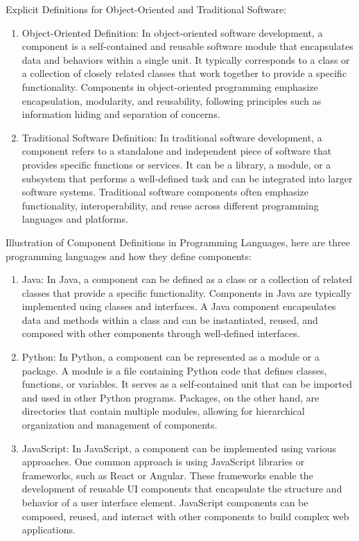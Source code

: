 \documentclass{article}
\begin{document}
Explicit Definitions for Object-Oriented and Traditional Software:
\begin{enumerate}
    \item Object-Oriented Definition: In object-oriented software development, a component is a self-contained and reusable software module that encapsulates data and behaviors within a single unit. It typically corresponds to a class or a collection of closely related classes that work together to provide a specific functionality. Components in object-oriented programming emphasize encapsulation, modularity, and reusability, following principles such as information hiding and separation of concerns.
    \item Traditional Software Definition: In traditional software development, a component refers to a standalone and independent piece of software that provides specific functions or services. It can be a library, a module, or a subsystem that performs a well-defined task and can be integrated into larger software systems. Traditional software components often emphasize functionality, interoperability, and reuse across different programming languages and platforms.
\end{enumerate}
Illustration of Component Definitions in Programming Languages, here are three programming languages and how they define components:
\begin{enumerate}
    \item Java: In Java, a component can be defined as a class or a collection of related classes that provide a specific functionality. Components in Java are typically implemented using classes and interfaces. A Java component encapsulates data and methods within a class and can be instantiated, reused, and composed with other components through well-defined interfaces.
    \item Python: In Python, a component can be represented as a module or a package. A module is a file containing Python code that defines classes, functions, or variables. It serves as a self-contained unit that can be imported and used in other Python programs. Packages, on the other hand, are directories that contain multiple modules, allowing for hierarchical organization and management of components.
    \item JavaScript: In JavaScript, a component can be implemented using various approaches. One common approach is using JavaScript libraries or frameworks, such as React or Angular. These frameworks enable the development of reusable UI components that encapsulate the structure and behavior of a user interface element. JavaScript components can be composed, reused, and interact with other components to build complex web applications.
\end{enumerate}
\end{document}
